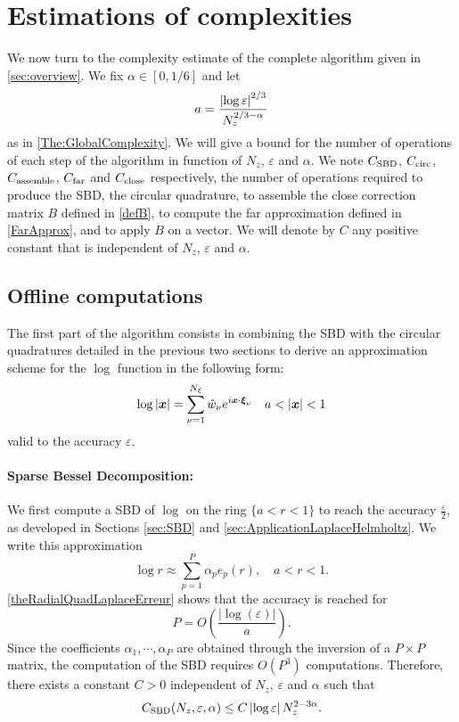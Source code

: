 \documentclass[smallextended]{svjour3}
\begin{document}
																																																		
																																																		
																																																		
\section{Estimations of complexities}
\label{sec:complexities}
We now turn to the complexity estimate of the complete algorithm given in \autoref{sec:overview}. We fix $\alpha \in [0,1/6]$ and let 
\begin{equation}
	\label{def_a}
	a = \dfrac{\left\lvert \log\varepsilon \right\rvert^{2/3}}{N_z^{2/3 - \alpha}}
\end{equation}  
as in \autoref{The:GlobalComplexity}. We will give a bound for the number of operations of each step of the algorithm in function of $N_z$, $\varepsilon$ and $\alpha$. We note  $C_{\textup{SBD}}$, $C_{\textup{circ}}$, $C_{\textup{assemble}}$, $C_{\textup{far}}$ and $C_{\textup{close}}$ respectively, the number of operations required  to produce the SBD, the circular quadrature, to assemble the close correction matrix $B$ defined in \eqref{defB}, to compute the far approximation defined in \eqref{FarApprox}, and to apply $B$ on a vector. We will denote by $C$ any positive constant that is independent of $N_z$, $\varepsilon$ and $\alpha$. 
\subsection{Offline computations}
The first part of the algorithm consists in combining the SBD with the circular quadratures detailed in the previous two sections to derive an approximation scheme for the $\log$ function in the following form: 
\[ \log |\boldsymbol{x}| = \sum_{\nu=1}^{N_\xi} \hat{w}_{\nu} e^{i \boldsymbol{x}\cdot \boldsymbol{\xi}_{\nu}} \quad a < \left\lvert \boldsymbol{x} \right\rvert < 1\]
valid to the accuracy $\varepsilon$.
																																																		
\paragraph{Sparse Bessel Decomposition:}
We first compute a SBD of $\log$ on the ring $\{a < r < 1\}$ to reach the accuracy $\frac{\varepsilon}{2}$, as  developed in Sections \ref{sec:SBD} and \ref{sec:ApplicationLaplaceHelmholtz}. We write this approximation
\[ \log r \approx \sum_{p=1}^P \alpha_p e_p(r), \quad a < r < 1.\]
\autoref{theRadialQuadLaplaceErreur} shows that the accuracy is reached for 
\begin{equation}
	\label{eq:valeurDePenFonctionDe_a}
	P = O\left(\dfrac{|\log(\varepsilon)|}{a}\right).
\end{equation}
Since the coefficients $\alpha_1,\cdots,\alpha_P$ are obtained through the inversion of a $P \times P$ matrix, the computation of the SBD requires $O(P^3)$ computations. Therefore, there exists a constant $C>0$ independent of $N_z$, $\varepsilon$ and $\alpha$ such that 
\begin{equation}
	\label{Complex:SBD}
	C_{\textup{SBD}}(N_z,\varepsilon,\alpha) \leq C \left\lvert \log\varepsilon \right\rvert N_z^{2 - 3\alpha}.
\end{equation}
																																																		
\end{document}
